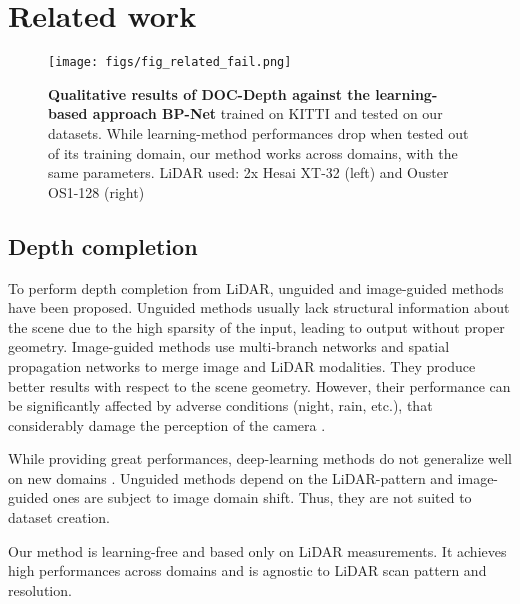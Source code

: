 \section{Related work}
\begin{figure}[t]
    \centering
    \texttt{[image: figs/fig\_related\_fail.png]}
    \vspace{-15pt}
    \caption{\textbf{Qualitative results of DOC-Depth against the learning-based approach BP-Net} \cite{tang2024bilateral} trained on KITTI and tested on our datasets. While learning-method performances drop when tested out of its training domain, our method works across domains, with the same parameters. LiDAR used: 2x Hesai XT-32 (left) and Ouster OS1-128 (right)}
    \label{fig:related_work_fail}
    \vspace{-15pt}
\end{figure}

\subsection{Depth completion}

To perform depth completion from LiDAR, unguided \cite{uhrig2017sparsity,eldesokey2020uncertainty,eldesokey2019propagating} and image-guided \cite{zhang2023completionformer,nazir2022semattnet,tang2024bilateral} methods have been proposed. Unguided methods usually lack structural information about the scene due to the high sparsity of the input, leading to output without proper geometry. Image-guided methods use multi-branch networks and spatial propagation networks to merge image and LiDAR modalities. They produce better results with respect to the scene geometry. However, their performance can be significantly affected by adverse conditions (night, rain, etc.), that considerably damage the perception of the camera \cite{SDV21}.

While providing great performances, deep-learning methods do not generalize well on new domains . Unguided methods depend on the LiDAR-pattern and image-guided ones are subject to image domain shift. Thus, they are not suited to dataset creation.  

Our method is learning-free and based only on LiDAR measurements. It achieves high performances across domains and is agnostic to LiDAR scan pattern and resolution.


